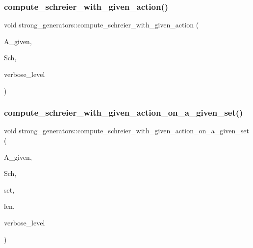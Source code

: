 \subsubsection{\texorpdfstring{compute\+\_\+schreier\+\_\+with\+\_\+given\+\_\+action()}{compute\_schreier\_with\_given\_action()}}
{\footnotesize\ttfamily void strong\+\_\+generators\+::compute\+\_\+schreier\+\_\+with\+\_\+given\+\_\+action (\begin{DoxyParamCaption}\item[{\mbox{\hyperlink{classaction}{action}} $\ast$}]{A\+\_\+given,  }\item[{\mbox{\hyperlink{classschreier}{schreier}} $\ast$\&}]{Sch,  }\item[{\mbox{\hyperlink{galois_8h_a09fddde158a3a20bd2dcadb609de11dc}{I\+NT}}}]{verbose\+\_\+level }\end{DoxyParamCaption})}

\mbox{\label{classstrong__generators_aa051afe7d56819e4ebfb45c3f8506a72}} 
\subsubsection{\texorpdfstring{compute\+\_\+schreier\+\_\+with\+\_\+given\+\_\+action\+\_\+on\+\_\+a\+\_\+given\+\_\+set()}{compute\_schreier\_with\_given\_action\_on\_a\_given\_set()}}
{\footnotesize\ttfamily void strong\+\_\+generators\+::compute\+\_\+schreier\+\_\+with\+\_\+given\+\_\+action\+\_\+on\+\_\+a\+\_\+given\+\_\+set (\begin{DoxyParamCaption}\item[{\mbox{\hyperlink{classaction}{action}} $\ast$}]{A\+\_\+given,  }\item[{\mbox{\hyperlink{classschreier}{schreier}} $\ast$\&}]{Sch,  }\item[{\mbox{\hyperlink{galois_8h_a09fddde158a3a20bd2dcadb609de11dc}{I\+NT}} $\ast$}]{set,  }\item[{\mbox{\hyperlink{galois_8h_a09fddde158a3a20bd2dcadb609de11dc}{I\+NT}}}]{len,  }\item[{\mbox{\hyperlink{galois_8h_a09fddde158a3a20bd2dcadb609de11dc}{I\+NT}}}]{verbose\+\_\+level }\end{DoxyParamCaption})}

